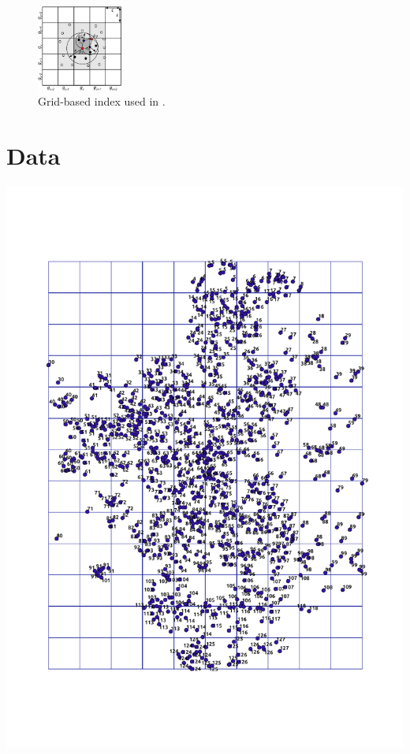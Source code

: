 \documentclass[10pt]{scrartcl}
\begin{document}
\begin{enumerate}
\begin{figure}[h!]
 \centering
 \includegraphics[width=0.25\textwidth]{figures/bfe.png}
 \caption{Grid-based index used in \citep{vieira_-line_2009}.}
 \label{fig:grid}
\end{figure}


\end{enumerate}

\section{Data}
\includegraphics[width=\textwidth]{./grid}
\end{document}
